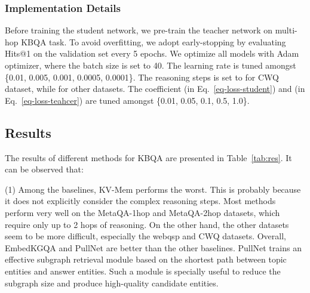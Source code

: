\subsubsection{Implementation Details}
Before training the student network, we pre-train the teacher network on multi-hop KBQA task. To avoid overfitting, we adopt early-stopping by evaluating Hits@1 on the validation set every 5 epochs. We optimize all models with Adam optimizer, where the batch size is set to 40. The learning rate is tuned amongst \{0.01, 0.005, 0.001, 0.0005, 0.0001\}. The reasoning steps is set to  for CWQ dataset, while  for other datasets. 
The coefficient  (in Eq.~\ref{eq-loss-student}) and (in Eq.~\ref{eq-loss-teahcer}) are tuned amongst \{0.01, 0.05, 0.1, 0.5, 1.0\}.

\subsection{Results}

The results of different methods for KBQA are presented in Table~\ref{tab:res}. It can be observed that:

(1) Among the baselines, KV-Mem performs the worst.
This is probably because it does not explicitly consider the complex 
reasoning steps.
Most methods perform very well on the MetaQA-1hop and MetaQA-2hop datasets, which require only up to 2 hops of reasoning.
On the other hand, the other datasets seem to be more difficult, especially the webqsp and CWQ datasets. 
Overall, EmbedKGQA and PullNet are better than the other baselines. 
PullNet trains an effective subgraph retrieval module based
on the shortest path between topic entities and answer entities. 
Such a module is specially useful to reduce the subgraph size and produce high-quality candidate entities.








